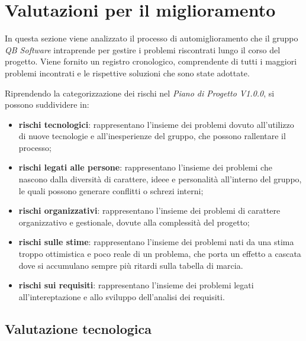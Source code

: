 \section{Valutazioni per il miglioramento} \label{valutazioni}
In questa sezione viene analizzato il processo di automiglioramento che il gruppo
\textit{QB Software} intraprende per gestire i problemi riscontrati lungo il corso del progetto.
Viene fornito un registro cronologico, comprendente di tutti i maggiori problemi incontrati
e le rispettive soluzioni che sono state adottate.

\noindent Riprendendo la categorizzazione dei rischi nel \textit{Piano di Progetto V1.0.0},
si possono suddividere in:

\begin{itemize}
    \item \textbf{rischi tecnologici}: rappresentano l'insieme dei problemi dovuto all'utilizzo di 
                nuove tecnologie e all'inesperienze del gruppo, che possono rallentare il processo;
    \item \textbf{rischi legati alle persone}: rappresentano l'insieme dei problemi che nascono dalla diversità di
                carattere, ideee e personalità all'interno del gruppo, le quali possono generare conflitti o schrezi interni;
    \item  \textbf{rischi organizzativi}: rappresentano l'insieme dei problemi di carattere organizzativo
                e gestionale, dovute alla complessità del progetto;
    \item \textbf{rischi sulle stime}: rappresentano l'insieme dei problemi nati da una stima troppo ottimistica e poco reale di un problema,
                che porta un effetto a cascata dove si accumulano sempre più ritardi sulla tabella di marcia.
    \item \textbf{rischi sui requisiti}: rappresentano l'insieme dei problemi legati all'intereptazione 
    e allo sviluppo dell'analisi dei requisiti.
\end{itemize}


\subsection{Valutazione tecnologica}

